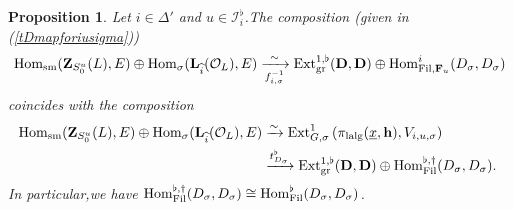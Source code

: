 \documentclass[10pt]{article}
\newtheorem{pro}[thm]{Proposition}
\newcommand{\fil}{{\rm Fil}}
\newcommand{\homo}{{\rm Hom}}
\newcommand{\ext}{{\rm Ext}}
\newcommand{\sm}{{\rm sm}}
\newcommand{\lalg}{{\rm lalg}}
\newcommand{\gr}{{\rm gr}}
\newcommand{\Dpik}{{\mathbf{D}}}
\newcommand{\bF}{{\mathbf{F}}}
\newcommand{\bL}{{\mathbf{L}}}
\newcommand{\bZ}{{\mathbf{Z}}}
\newcommand{\bh}{{\mathbf{h}}}
\newcommand{\cI}{\mathcal I}
\newcommand{\cO}{\mathcal O}
\begin{document}
\begin{pro}\label{comparesharpflat}
Let $i\in \Delta'$ and $u\in \cI_{i}^{\flat}$.\;The composition (given in (\ref{tDmapforiusigma}))
\begin{equation}
	\begin{aligned}
		\homo_{\sm}(\bZ_{S^u_0}(L),E)\oplus\homo_{\sigma}(\bL_{\widehat{i}}(\cO_L),E)\xrightarrow[f_{i,\sigma}^{-1}]{\sim}\ext^{1,\flat}_{\gr}({\Dpik},{\Dpik})\oplus\homo^i_{\fil,\bF_u}(D_{\sigma},D_{\sigma})
	\end{aligned}
\end{equation}
coincides with the composition
\begin{equation}
	\begin{aligned}
		\homo_{\sm}(\bZ_{S^u_0}(L),E)\oplus\homo_{\sigma}(\bL_{\widehat{i}}(\cO_L),E)&\xrightarrow{\sim}\ext^1_{G,\sigma}\left(\pi_{\lalg}(\underline{x},\bh),V_{i,u,\sigma}\right)\\&\xrightarrow{t^{\flat}_{D_{\sigma}}}\ext^{1,\flat}_{\gr}({\Dpik},{\Dpik})\oplus\homo^{\flat,\dagger}_{\fil}(D_{\sigma},D_{\sigma}).\;
	\end{aligned}
\end{equation}In particular,\;we have $\homo^{\flat,\dagger}_{\fil}(D_{\sigma},D_{\sigma})\cong \homo^{\flat}_{\fil}(D_{\sigma},D_{\sigma})$.\;
\end{pro}
\end{document}
